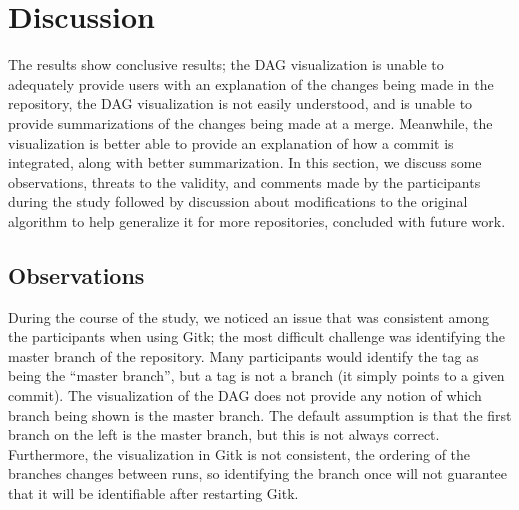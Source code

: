
\section{Discussion}
\label{sec:discussion}

The results show conclusive results; the DAG visualization  is unable to 
adequately provide users with an explanation of the changes being made
in the repository, the DAG visualization is not easily understood, and
is unable to provide summarizations of the changes being made at a
merge. Meanwhile, the \mt visualization  is better able to provide an
explanation of how a commit is integrated, along with better
summarization. In this section, we discuss some observations, threats to
the validity, and comments made by the participants during the study
followed by discussion about modifications to the original algorithm to
help generalize it for more repositories, concluded with future work.


\subsection{Observations}
\label{sub:observations}


During the course of the study, we noticed an issue that was consistent
among the participants when using Gitk;  the most difficult challenge was
identifying the master branch of the repository. Many participants would
identify the tag as being the ``master branch'', but a tag is not a
branch (it simply points to a given commit). The visualization of the DAG does not provide any notion of
which branch being shown is the master branch. The default assumption is
that the first branch on the left is the master branch, but this is not
always correct. Furthermore, the visualization in Gitk is not
consistent, the ordering of the branches changes between runs, so
identifying the branch once will not guarantee that it will be
identifiable after restarting Gitk.

